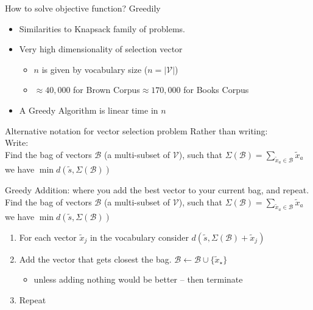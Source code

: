 \documentclass[]{beamer}
\newcommand{\s}{\tilde{s}}
\newcommand{\x}{\tilde{x}}
\newcommand{\V}{\mathcal{V}}
\newcommand{\B}{\mathcal{B}}
\begin{document}
\begin{frame}{How to solve objective function? Greedily}
	\vectorselectionproblemdefn
		\vfill
	\begin{itemize}
		\item<1-> Similarities to Knapsack family of problems.
		\item<2-> Very high dimensionality of selection vector\begin{itemize}
			\item $n$ is given by vocabulary size ($n=|\V|$)
			\item $\approx40,000$ for Brown Corpus\hfill $\approx170,000$ for Books Corpus\hspace{1em}
			\end{itemize}
		\item<3-> A Greedy Algorithm is linear time in $n$ 
	\end{itemize}
	\vfill
\end{frame}

\newcommand{\vectorselectionproblemdefnalt}{Find the bag of vectors $\B$ (a multi-subset of $\V$), such that $\displaystyle \Sigma(\B)=\sum_{\x_a\in\B}\x_a$ we have  $\min d(\s,\Sigma(\B))$}

\begin{frame}{Alternative notation for vector selection problem}
	Rather than writing:\\
		\vectorselectionproblemdefn
	\vfill
	Write:\\
		\vectorselectionproblemdefnalt
	\vfill
	
\end{frame}


\begin{frame}{Greedy Addition: where you add the best vector to your current bag, and repeat.}
	\vectorselectionproblemdefnalt
	\vfill
	\begin{enumerate}
		\item For each vector $\x_j$ in the vocabulary consider  $d(\s, \Sigma(\B)+\x_j)$
		\item Add the vector that gets closest the bag. $\B\leftarrow\B\cup\{\x_\star\}$
			\begin{itemize}
				\item unless adding nothing would be better -- then terminate
			\end{itemize}
		\item Repeat
	\end{enumerate}
	\vfill
\end{frame}
\end{document}
